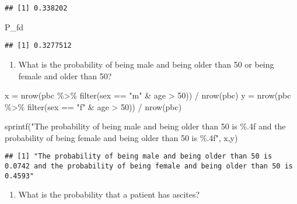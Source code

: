 \documentclass[
]{article}
\newenvironment{Shaded}{\begin{snugshade}}{\end{snugshade}}
\newcommand{\DecValTok}[1]{\textcolor[rgb]{0.00,0.00,0.81}{#1}}
\newcommand{\FunctionTok}[1]{\textcolor[rgb]{0.00,0.00,0.00}{#1}}
\newcommand{\NormalTok}[1]{#1}
\newcommand{\OtherTok}[1]{\textcolor[rgb]{0.56,0.35,0.01}{#1}}
\newcommand{\SpecialCharTok}[1]{\textcolor[rgb]{0.00,0.00,0.00}{#1}}
\newcommand{\StringTok}[1]{\textcolor[rgb]{0.31,0.60,0.02}{#1}}
\providecommand{\tightlist}{%
  \setlength{\itemsep}{0pt}\setlength{\parskip}{0pt}}
\begin{document}
\begin{verbatim}
## [1] 0.338202
\end{verbatim}

\begin{Shaded}
\begin{Highlighting}[]
\NormalTok{P\_fd}
\end{Highlighting}
\end{Shaded}

\begin{verbatim}
## [1] 0.3277512
\end{verbatim}

\begin{enumerate}
\def\labelenumi{\alph{enumi})}
\setcounter{enumi}{5}
\tightlist
\item
  What is the probability of being male and being older than 50 or being
  female and older than 50?
\end{enumerate}

\begin{Shaded}
\begin{Highlighting}[]
\NormalTok{x }\OtherTok{=} \FunctionTok{nrow}\NormalTok{(pbc }\SpecialCharTok{\%\textgreater{}\%}
       \FunctionTok{filter}\NormalTok{(sex }\SpecialCharTok{==} \StringTok{"m"} \SpecialCharTok{\&}\NormalTok{ age }\SpecialCharTok{\textgreater{}} \DecValTok{50}\NormalTok{)) }\SpecialCharTok{/} 
  \FunctionTok{nrow}\NormalTok{(pbc)}
\NormalTok{y }\OtherTok{=} \FunctionTok{nrow}\NormalTok{(pbc }\SpecialCharTok{\%\textgreater{}\%}
           \FunctionTok{filter}\NormalTok{(sex }\SpecialCharTok{==} \StringTok{"f"} \SpecialCharTok{\&}\NormalTok{ age }\SpecialCharTok{\textgreater{}} \DecValTok{50}\NormalTok{)) }\SpecialCharTok{/} 
  \FunctionTok{nrow}\NormalTok{(pbc)}

\FunctionTok{sprintf}\NormalTok{(}\StringTok{"The probability of being male and being older than 50 is \%.4f and the probability of being female and being older than 50 is \%.4f"}\NormalTok{, x,y)}
\end{Highlighting}
\end{Shaded}

\begin{verbatim}
## [1] "The probability of being male and being older than 50 is 0.0742 and the probability of being female and being older than 50 is 0.4593"
\end{verbatim}

\begin{enumerate}
\def\labelenumi{\alph{enumi})}
\setcounter{enumi}{6}
\tightlist
\item
  What is the probability that a patient has ascites?
\end{enumerate}
\end{document}
